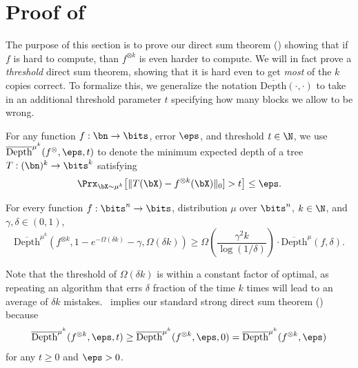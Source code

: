 \documentclass[11pt]{article}
\newcommand{\odepth}{\overline{\mathrm{Depth}}}
\newcommand{\odepthmu}{\overline{\mathrm{Depth}}^\mu}
\newcommand{\odepthmuk}{\overline{\mathrm{Depth}}^{\mu^k}}
\DeclarePairedDelimiter\lzero{\|}{\|_0}
\DeclarePairedDelimiter\bracket{[}{]}
\begin{document}

\section{Proof of~}
The purpose of this section is to prove our direct sum theorem () showing that if $f$ is hard to compute, than $f^{\otimes k}$ is even harder to compute. We will in fact prove a {\sl threshold} direct sum theorem, showing that it is hard even to get {\sl most} of the $k$ copies correct. To formalize this, we generalize the notation $\odepth(\cdot, \cdot)$ to take in an additional threshold parameter $t$ specifying how many blocks we allow to be wrong.
\begin{definition}
    \label{def:threshold-DPT}
    For any function $f:\bn \to \bits$, error $\eps$, and threshold $t \in \N$, we use $\odepthmuk(f^{\otimes}, \eps, t)$ to denote the minimum expected depth of a tree $T:(\bn)^k \to \bits^k$ satisfying
    \begin{equation*}
        \Prx_{\bX \sim \mu^k}\bracket*{\lzero{T(\bX) - f^{\otimes k}(\bX)}] > t} \leq \eps.
    \end{equation*}
\end{definition}


\begin{theorem}
    \label{thm:threshold-DPT}
    For every function $f:\bits^n \to \bits$, distribution $\mu$ over $\bits^n$, $k \in \N$, and $\gamma, \delta \in (0,1)$,
    \begin{equation*}
        \odepthmuk(f^{\otimes k}, 1 - e^{-\Omega(\delta k)} - \gamma, \Omega(\delta k)) \geq \Omega\left( \frac{\gamma^2 k}{\log(1/\delta)}\right) \cdot \odepthmu(f,\delta).
    \end{equation*}
\end{theorem}

Note that the threshold of $\Omega(\delta k)$ is within a constant factor of optimal, as repeating an algorithm that errs $\delta$ fraction of the time $k$ times will lead to an average of $\delta k$ mistakes.~ implies our standard strong direct sum theorem () because \[ \odepthmuk(f^{\otimes k}, \eps, t) \geq \odepthmuk(f^{\otimes k}, \eps, 0) = \odepthmuk(f^{\otimes k}, \eps)\]  for any $t \geq 0$ and $\eps > 0$. 
\end{document}
